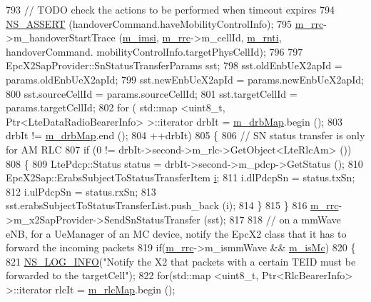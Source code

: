 \begin{DoxyCode}
793   \textcolor{comment}{// TODO check the actions to be performed when timeout expires}
794   \hyperlink{assert_8h_a6dccdb0de9b252f60088ce281c49d052}{NS\_ASSERT} (handoverCommand.haveMobilityControlInfo);
795   \hyperlink{classns3_1_1UeManager_ab4405e9f354c66e7c1a4c95832290f5b}{m\_rrc}->m\_handoverStartTrace (\hyperlink{classns3_1_1UeManager_a868dda076ecfc1d4202e357c16223d84}{m\_imsi}, \hyperlink{classns3_1_1UeManager_ab4405e9f354c66e7c1a4c95832290f5b}{m\_rrc}->m\_cellId, \hyperlink{classns3_1_1UeManager_a5a72b4fe818f21993bd7f05d7e2c4f83}{m\_rnti}, handoverCommand.
      mobilityControlInfo.targetPhysCellId);
796 
797   EpcX2SapProvider::SnStatusTransferParams sst;
798   sst.oldEnbUeX2apId = params.oldEnbUeX2apId;
799   sst.newEnbUeX2apId = params.newEnbUeX2apId;
800   sst.sourceCellId = params.sourceCellId;
801   sst.targetCellId = params.targetCellId;
802   \textcolor{keywordflow}{for} ( std::map <uint8\_t, Ptr<LteDataRadioBearerInfo> >::iterator drbIt = 
      \hyperlink{classns3_1_1UeManager_a18499c025730b63c73e5d93effff57aa}{m\_drbMap}.begin ();
803         drbIt != \hyperlink{classns3_1_1UeManager_a18499c025730b63c73e5d93effff57aa}{m\_drbMap}.end ();
804         ++drbIt)
805     \{
806       \textcolor{comment}{// SN status transfer is only for AM RLC}
807       \textcolor{keywordflow}{if} (0 != drbIt->second->m\_rlc->GetObject<LteRlcAm> ())
808         \{
809           LtePdcp::Status status = drbIt->second->m\_pdcp->GetStatus ();
810           EpcX2Sap::ErabsSubjectToStatusTransferItem \hyperlink{bernuolliDistribution_8m_a6f6ccfcf58b31cb6412107d9d5281426}{i};
811           i.dlPdcpSn = status.txSn;
812           i.ulPdcpSn = status.rxSn;
813           sst.erabsSubjectToStatusTransferList.push\_back (i);
814         \}
815     \}
816   \hyperlink{classns3_1_1UeManager_ab4405e9f354c66e7c1a4c95832290f5b}{m\_rrc}->m\_x2SapProvider->SendSnStatusTransfer (sst);
817 
818   \textcolor{comment}{// on a mmWave eNB, for a UeManager of an MC device, notify the EpcX2 class that it has to forward the
       incoming packets}
819   \textcolor{keywordflow}{if}(\hyperlink{classns3_1_1UeManager_ab4405e9f354c66e7c1a4c95832290f5b}{m\_rrc}->m\_ismmWave && \hyperlink{classns3_1_1UeManager_a78958b4916253f7e2f9da8fd7f4662b6}{m\_isMc})
820   \{
821     \hyperlink{group__logging_gafbd73ee2cf9f26b319f49086d8e860fb}{NS\_LOG\_INFO}(\textcolor{stringliteral}{"Notify the X2 that packets with a certain TEID must be forwarded to the
       targetCell"});
822     \textcolor{keywordflow}{for}(std::map <uint8\_t, Ptr<RlcBearerInfo> >::iterator rlcIt = \hyperlink{classns3_1_1UeManager_a64f37a901db7a322552ba08d87e65770}{m\_rlcMap}.begin ();

\end{DoxyCode}
